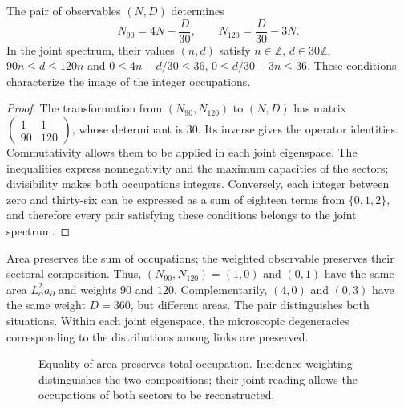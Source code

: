 \begin{theorem}
\label{rev4:ae:recuperacion}
The pair of observables \((N,D)\) determines
\begin{equation}
 N_{90}=4N-\frac{D}{30},
 \qquad N_{120}=\frac{D}{30}-3N.
 \label{rev4:ae:inversa}
\end{equation}
In the joint spectrum, their values \((n,d)\) satisfy
\(n\in\mathbb Z\), \(d\in30\mathbb Z\), \(90n\le d\le120n\) and
\(0\le4n-d/30\le36\), \(0\le d/30-3n\le36\).
These conditions characterize the image of the integer occupations.
\end{theorem}
\begin{proof}
The transformation from \((N_{90},N_{120})\) to \((N,D)\) has matrix
\(\left(\begin{smallmatrix}1&1\\90&120\end{smallmatrix}\right)\),
whose determinant is \(30\). Its inverse gives the operator
identities. Commutativity allows them to be applied in each joint
eigenspace. The inequalities express nonnegativity and the maximum
capacities of the sectors; divisibility makes both occupations integers.
Conversely, each integer between zero and thirty-six can be expressed as
a sum of eighteen terms from \(\{0,1,2\}\), and therefore every pair
satisfying these conditions belongs to the joint spectrum.
\end{proof}

Area preserves the sum of occupations; the weighted observable preserves
their sectoral composition. Thus, \((N_{90},N_{120})=(1,0)\) and \((0,1)\)
have the same area \(L_\alpha^2a_\partial\) and weights \(90\) and \(120\).
Complementarily, \((4,0)\) and \((0,3)\) have the same weight
\(D=360\), but different areas. The pair distinguishes both situations.
Within each joint eigenspace, the microscopic degeneracies
corresponding to the distributions among links are preserved.

\begin{figure}[htbp]
\centering
{}
\caption{Equality of area preserves total occupation. Incidence
weighting distinguishes the two compositions; their joint reading allows
the occupations of both sectors to be reconstructed.}
\label{rev4:ae:figura}
\end{figure}

